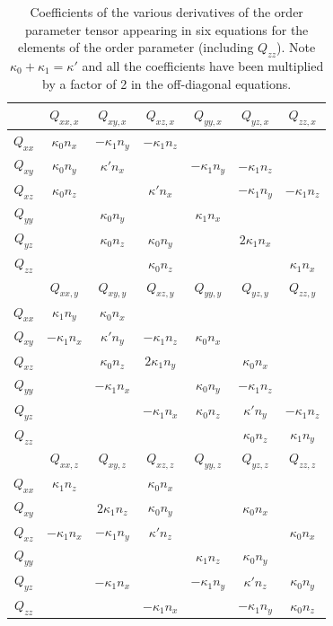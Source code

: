{\begin{table}
\begin{center}
\begin{tabular}{|c|cccccc|}
\hline
&
$Q_{xx,x}$ & $Q_{xy,x}$ & $Q_{xz,x}$ & $Q_{yy,x}$ & $Q_{yz,x}$ & $Q_{zz,x}$\\
\hline
$Q_{xx}$ &
$\kappa_0 n_x$ & $-\kappa_1 n_y$ & $-\kappa_1 n_z$ & & &\\
$Q_{xy}$ &
$\kappa_0 n_y$ & $\kappa' n_x$ & & $-\kappa_1 n_y$  & $-\kappa_1 n_z$ & \\
$Q_{xz}$ &
$\kappa_0 n_z$ & & $\kappa' n_x$ & & $-\kappa_1 n_y$ &$ -\kappa_1 n_z$\\
$Q_{yy}$ &
 & $\kappa_0 n_y$ & & $\kappa_1 n_x$ & &\\
$Q_{yz}$ &
 & $\kappa_0 n_z$ & $\kappa_0 n_y$ & & $2\kappa_1 n_x$ & \\
$Q_{zz}$ &
 & & $\kappa_0 n_z$ & & & $\kappa_1 n_x$\\
\hline
\hline
&
$Q_{xx,y}$ & $Q_{xy,y}$ & $Q_{xz,y}$ & $Q_{yy,y}$ & $Q_{yz,y}$ & $Q_{zz,y}$\\
\hline
$Q_{xx}$ &
$\kappa_1 n_y$ & $\kappa_0 n_x$ & & & &\\
$Q_{xy}$ &
$-\kappa_1 n_x$ & $\kappa' n_y$ & $-\kappa_1 n_z$ & $\kappa_0 n_x$ & &\\
$Q_{xz}$ &
 & $\kappa_0 n_z$ & $2\kappa_1 n_y$ & & $\kappa_0 n_x$ & \\
$Q_{yy}$ &
 & $-\kappa_1 n_x$ & & $\kappa_0 n_y$ & $-\kappa_1 n_z$ & \\
$Q_{yz}$ &
 & & $-\kappa_1 n_x$ & $\kappa_0 n_z$ & $\kappa' n_y$ & $-\kappa_1 n_z$\\
$Q_{zz}$ &
 & & & & $\kappa_0 n_z$ & $\kappa_1 n_y$\\
\hline
\hline
&
$Q_{xx,z}$ & $Q_{xy,z}$ & $Q_{xz,z}$ & $Q_{yy,z}$ & $Q_{yz,z}$ & $Q_{zz,z}$\\
\hline
$Q_{xx}$ &
$\kappa_1 n_z$ & & $\kappa_0 n_x$ & & & \\
$Q_{xy}$ &
 & $2\kappa_1 n_z$ & $\kappa_0 n_y$ & & $\kappa_0 n_x$ & \\
$Q_{xz}$ &
$-\kappa_1 n_x$ & $-\kappa_1 n_y$ & $\kappa' n_z$ & & & $\kappa_0 n_x$  \\
$Q_{yy}$ &
 & & & $\kappa_1 n_z$ & $\kappa_0 n_y$ & \\
$Q_{yz}$ &
 & $-\kappa_1 n_x$ & & $-\kappa_1 n_y$ & $\kappa' n_z$ & $\kappa_0 n_y$ \\
$Q_{zz}$ &
 & & $-\kappa_1 n_x$ & & $-\kappa_1 n_y $ & $\kappa_0 n_z$\\
\hline
\end{tabular}
\end{center}
\caption{Coefficients of the various derivatives of the order parameter
tensor appearing in six equations for the elements of the
order parameter (including $Q_{zz}$).
Note $\kappa_0 + \kappa_1 = \kappa'$ and all the
coefficients have been multiplied by a factor of 2 in the off-diagonal
equations.}
\label{tab:cholesteric_bcs}
\end{table} 
}


